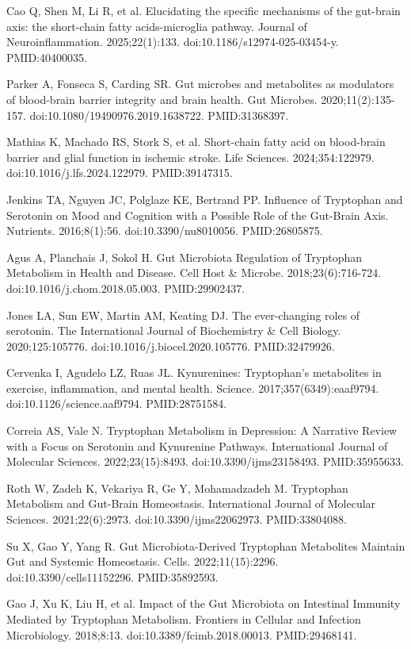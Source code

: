 \documentclass[12pt,oneside]{book}
\newcommand{\reff}[2]{\par\hangindent=7mm\hangafter=1\noindent[#1]\hspace{2mm}#2\par}
\begin{document}
\reff{20}{Cao Q, Shen M, Li R, et al. Elucidating the specific mechanisms of the gut-brain axis: the short-chain fatty acids-microglia pathway. Journal of Neuroinflammation. 2025;22(1):133. doi:10.1186/s12974-025-03454-y. PMID:40400035.}

\reff{21}{Parker A, Fonseca S, Carding SR. Gut microbes and metabolites as modulators of blood-brain barrier integrity and brain health. Gut Microbes. 2020;11(2):135-157. doi:10.1080/19490976.2019.1638722. PMID:31368397.}

\reff{22}{Mathias K, Machado RS, Stork S, et al. Short-chain fatty acid on blood-brain barrier and glial function in ischemic stroke. Life Sciences. 2024;354:122979. doi:10.1016/j.lfs.2024.122979. PMID:39147315.}

\reff{23}{Jenkins TA, Nguyen JC, Polglaze KE, Bertrand PP. Influence of Tryptophan and Serotonin on Mood and Cognition with a Possible Role of the Gut-Brain Axis. Nutrients. 2016;8(1):56. doi:10.3390/nu8010056. PMID:26805875.}

\reff{24}{Agus A, Planchais J, Sokol H. Gut Microbiota Regulation of Tryptophan Metabolism in Health and Disease. Cell Host \& Microbe. 2018;23(6):716-724. doi:10.1016/j.chom.2018.05.003. PMID:29902437.}

\reff{25}{Jones LA, Sun EW, Martin AM, Keating DJ. The ever-changing roles of serotonin. The International Journal of Biochemistry \& Cell Biology. 2020;125:105776. doi:10.1016/j.biocel.2020.105776. PMID:32479926.}

\reff{26}{Cervenka I, Agudelo LZ, Ruas JL. Kynurenines: Tryptophan's metabolites in exercise, inflammation, and mental health. Science. 2017;357(6349):eaaf9794. doi:10.1126/science.aaf9794. PMID:28751584.}

\reff{27}{Correia AS, Vale N. Tryptophan Metabolism in Depression: A Narrative Review with a Focus on Serotonin and Kynurenine Pathways. International Journal of Molecular Sciences. 2022;23(15):8493. doi:10.3390/ijms23158493. PMID:35955633.}

\reff{28}{Roth W, Zadeh K, Vekariya R, Ge Y, Mohamadzadeh M. Tryptophan Metabolism and Gut-Brain Homeostasis. International Journal of Molecular Sciences. 2021;22(6):2973. doi:10.3390/ijms22062973. PMID:33804088.}

\reff{29}{Su X, Gao Y, Yang R. Gut Microbiota-Derived Tryptophan Metabolites Maintain Gut and Systemic Homeostasis. Cells. 2022;11(15):2296. doi:10.3390/cells11152296. PMID:35892593.}

\reff{30}{Gao J, Xu K, Liu H, et al. Impact of the Gut Microbiota on Intestinal Immunity Mediated by Tryptophan Metabolism. Frontiers in Cellular and Infection Microbiology. 2018;8:13. doi:10.3389/fcimb.2018.00013. PMID:29468141.}
\end{document}
